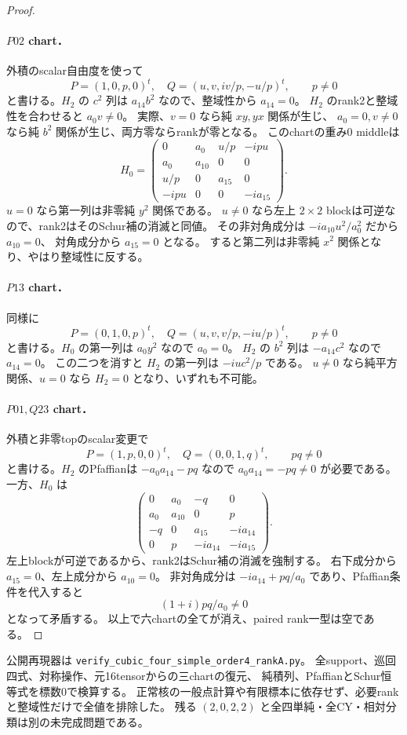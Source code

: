 \begin{proof}
\paragraph{$P02$ chart．}
外積のscalar自由度を使って
\[
 P=(1,0,p,0)^t,\quad
 Q=(u,v,iv/p,-u/p)^t,\qquad p\ne0
\]
と書ける。$H_2$ の $c^2$ 列は $a_{14}b^2$ なので、整域性から $a_{14}=0$。
$H_2$ のrank2と整域性を合わせると $a_0v\ne0$。
実際、$v=0$ なら純 $xy,yx$ 関係が生じ、
$a_0=0,v\ne0$ なら純 $b^2$ 関係が生じ、両方零ならrankが零となる。
このchartの重み0 middleは
\[
 H_0=\begin{pmatrix}
 0&a_0&u/p&-ipu\\a_0&a_{10}&0&0\\
 u/p&0&a_{15}&0\\-ipu&0&0&-ia_{15}
 \end{pmatrix}.
\]
$u=0$ なら第一列は非零純 $y^2$ 関係である。
$u\ne0$ なら左上 $2\times2$ blockは可逆なので、rank2はそのSchur補の消滅と同値。
その非対角成分は $-ia_{10}u^2/a_0^2$ だから $a_{10}=0$、
対角成分から $a_{15}=0$ となる。
すると第二列は非零純 $x^2$ 関係となり、やはり整域性に反する。

\paragraph{$P13$ chart．}
同様に
\[
 P=(0,1,0,p)^t,\quad
 Q=(u,v,v/p,-iu/p)^t,\qquad p\ne0
\]
と書ける。$H_0$ の第一列は $a_0y^2$ なので $a_0=0$。
$H_2$ の $b^2$ 列は $-a_{14}c^2$ なので $a_{14}=0$。
この二つを消すと $H_2$ の第一列は $-iu c^2/p$ である。
$u\ne0$ なら純平方関係、$u=0$ なら $H_2=0$ となり、いずれも不可能。

\paragraph{$P01,Q23$ chart．}
外積と非零topのscalar変更で
\[
 P=(1,p,0,0)^t,\quad Q=(0,0,1,q)^t,\qquad pq\ne0
\]
と書ける。$H_2$ のPfaffianは $-a_0a_{14}-pq$ なので
$a_0a_{14}=-pq\ne0$ が必要である。
一方、$H_0$ は
\[
 \begin{pmatrix}
 0&a_0&-q&0\\a_0&a_{10}&0&p\\
 -q&0&a_{15}&-ia_{14}\\0&p&-ia_{14}&-ia_{15}
 \end{pmatrix}.
\]
左上blockが可逆であるから、rank2はSchur補の消滅を強制する。
右下成分から $a_{15}=0$、左上成分から $a_{10}=0$。
非対角成分は $-ia_{14}+pq/a_0$ であり、Pfaffian条件を代入すると
\[
 (1+i)pq/a_0\ne0
\]
となって矛盾する。
以上で六chartの全てが消え、paired rank一型は空である。
\end{proof}

公開再現器は \texttt{verify\_cubic\_four\_simple\_order4\_rankA.py}。
全support、巡回四式、対称操作、元16tensorからの三chartの復元、
純積列、PfaffianとSchur恒等式を標数0で検算する。
正常核の一般点計算や有限標本に依存せず、必要rankと整域性だけで全値を排除した。
残る $(2,0,2,2)$ と全四単純・全CY・相対分類は別の未完成問題である。
